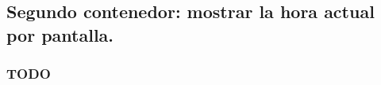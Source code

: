 

\subsection{Segundo contenedor: mostrar la hora actual por pantalla.}

\subsubsection{TODO}

\begin{listing}[style=consola]
    $ 
\end{listing}
